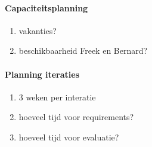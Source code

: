 \paragraph{Capaciteitsplanning}

\begin{enumerate}
 \item vakanties?
 \item beschikbaarheid Freek en Bernard?
\end{enumerate}

\paragraph{Planning iteraties}
\begin{enumerate}
 \item 3 weken per interatie
 \item hoeveel tijd voor requirements?
 \item hoeveel tijd voor evaluatie?
\end{enumerate}